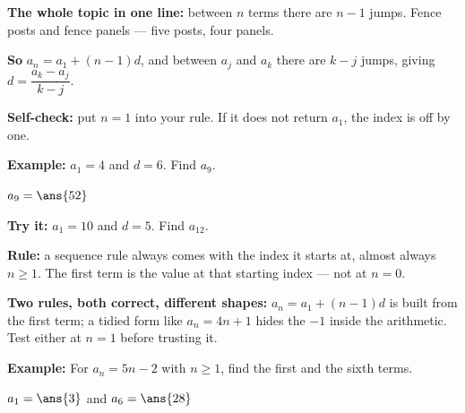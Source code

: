 \documentclass[12pt]{article}
\begin{document}


\begin{formulabox}
\textbf{The whole topic in one line:} between $n$ terms there are $n-1$ jumps. Fence posts and fence panels --- five posts, four panels.\par
\textbf{So} $a_n = a_1 + (n-1)d$, and between $a_j$ and $a_k$ there are $k-j$ jumps, giving $d = \dfrac{a_k - a_j}{k - j}$.\par
\textbf{Self-check:} put $n = 1$ into your rule. If it does not return $a_1$, the index is off by one.
\end{formulabox}

\begin{examplebox}
\textbf{Example:} \quad $a_1 = 4$ and $d = 6$. Find $a_9$.

$a_9 = \ans{52}$
\end{examplebox}

\begin{tryitbox}
\textbf{Try it:} \quad $a_1 = 10$ and $d = 5$. Find $a_{12}$.\\[2pt]
\end{tryitbox}


\begin{formulabox}
\textbf{Rule:} a sequence rule always comes with the index it starts at, almost always $n \ge 1$. The first term is the value at that starting index --- not at $n = 0$.\par
\textbf{Two rules, both correct, different shapes:} $a_n = a_1 + (n-1)d$ is built from the first term; a tidied form like $a_n = 4n + 1$ hides the $-1$ inside the arithmetic. Test either at $n = 1$ before trusting it.
\end{formulabox}

\begin{examplebox}
\textbf{Example:} \quad For $a_n = 5n - 2$ with $n \ge 1$, find the first and the sixth terms.

$a_1 = \ans{3}$ \quad and \quad $a_6 = \ans{28}$
\end{examplebox}
\end{document}
